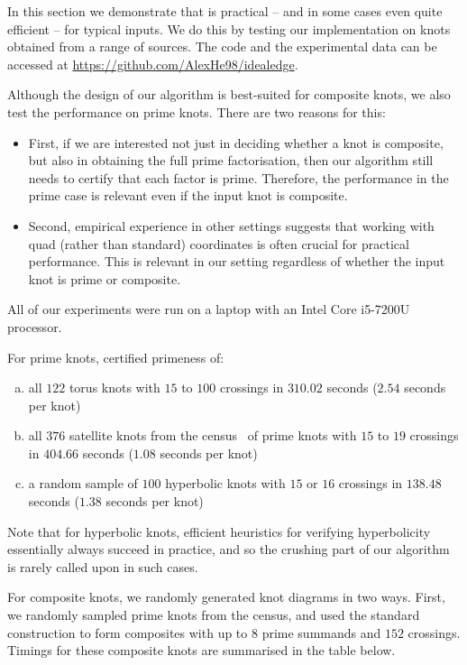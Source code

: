 \documentclass[10pt,a4paper]{amsart}
\begin{document}
In this section we demonstrate that 
is practical -- and in some cases even quite efficient -- for typical inputs.
We do this by testing our implementation on knots obtained from a range of sources.
The code and the experimental data can be accessed at \url{https://github.com/AlexHe98/idealedge}.

Although the design of our algorithm is best-suited for composite knots, we also test the performance on prime knots.
There are two reasons for this:
\begin{itemize}
\item
First, if we are interested not just in deciding whether a knot is composite, but also in obtaining the full prime factorisation, then our algorithm still needs to certify that each factor is prime.
Therefore, the performance in the prime case is relevant even if the input knot is composite.
\item
Second, empirical experience in other settings suggests that working with quad (rather than standard) coordinates is often crucial for practical performance.
This is relevant in our setting regardless of whether the input knot is prime or composite.
\end{itemize}
All of our experiments were run on a laptop with an Intel Core i5-7200U processor.

For prime knots,  certified primeness of:
\begin{enumerate}[(a)]
\item
all $122$ torus knots with $15$ to $100$ crossings in $310.02$ seconds ($2.54$ seconds per knot)
\item
all $376$ satellite knots from the census~\cite{burton2020knots} of prime knots with $15$ to $19$ crossings in $404.66$ seconds ($1.08$ seconds per knot)
\item
a random sample of $100$ hyperbolic knots with $15$ or $16$ crossings in $138.48$ seconds ($1.38$ seconds per knot)
\end{enumerate}
Note that for hyperbolic knots, efficient heuristics for verifying hyperbolicity essentially always succeed in practice, and so the crushing part of our algorithm is rarely called upon in such cases.

For composite knots, we randomly generated knot diagrams in two ways.
First, we randomly sampled prime knots from the census, and used the standard construction to form composites with up to $8$ prime summands and $152$ crossings.
Timings for these composite knots are summarised in the table below.
\end{document}
